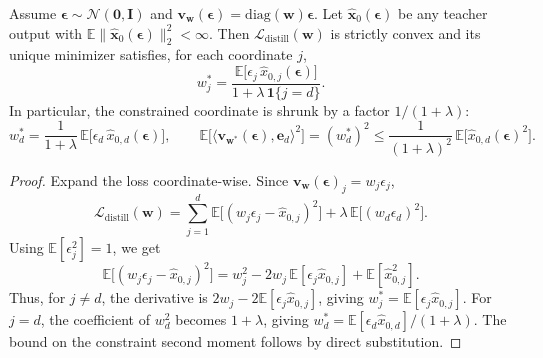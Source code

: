 \documentclass[10pt,a4paper]{amsart}
\begin{document}
\begin{theorem}
\label{thm:distill_closed_form}
Assume \(\bm{\epsilon}\sim\mathcal{N}(\bm{0},\bm{I})\) and \(\bm{v}_{\bm{w}}(\bm{\epsilon})=\mathrm{diag}(\bm{w})\bm{\epsilon}\).
Let \(\widehat{\bm{x}}_0(\bm{\epsilon})\) be any teacher output with \(\mathbb{E}\|\widehat{\bm{x}}_0(\bm{\epsilon})\|_2^2<\infty\).
Then \(\mathcal{L}_{\mathrm{distill}}(\bm{w})\) is strictly convex and its unique minimizer satisfies, for each coordinate \(j\),
\[
w_j^* =
\frac{\mathbb{E}\bigl[\epsilon_j\,\widehat{x}_{0,j}(\bm{\epsilon})\bigr]}{1+\lambda\,\mathbf{1}\{j=d\}}.
\]
In particular, the constrained coordinate is shrunk by a factor \(1/(1+\lambda)\):
\[
w_d^* = \frac{1}{1+\lambda}\,\mathbb{E}\bigl[\epsilon_d\,\widehat{x}_{0,d}(\bm{\epsilon})\bigr],
\qquad
\mathbb{E}\bigl[\langle \bm{v}_{\bm{w}^*}(\bm{\epsilon}),\bm{e}_d\rangle^2\bigr]
=
(w_d^*)^2
\le \frac{1}{(1+\lambda)^2}\,
\mathbb{E}\bigl[\widehat{x}_{0,d}(\bm{\epsilon})^2\bigr].
\]
\end{theorem}

\begin{proof}
Expand the loss coordinate-wise. Since \(\bm{v}_{\bm{w}}(\bm{\epsilon})_j = w_j\epsilon_j\),
\[
\mathcal{L}_{\mathrm{distill}}(\bm{w})
=
\sum_{j=1}^d
\mathbb{E}\bigl[(w_j\epsilon_j-\widehat{x}_{0,j})^2\bigr]
+
\lambda\,\mathbb{E}\bigl[(w_d\epsilon_d)^2\bigr].
\]
Using \(\mathbb{E}[\epsilon_j^2]=1\), we get
\[
\mathbb{E}\bigl[(w_j\epsilon_j-\widehat{x}_{0,j})^2\bigr]
=
w_j^2 - 2w_j\,\mathbb{E}[\epsilon_j\widehat{x}_{0,j}] + \mathbb{E}[\widehat{x}_{0,j}^2].
\]
Thus, for \(j\neq d\), the derivative is \(2w_j-2\mathbb{E}[\epsilon_j\widehat{x}_{0,j}]\), giving
\(w_j^*=\mathbb{E}[\epsilon_j\widehat{x}_{0,j}]\).
For \(j=d\), the coefficient of \(w_d^2\) becomes \(1+\lambda\), giving
\(w_d^*=\mathbb{E}[\epsilon_d\widehat{x}_{0,d}]/(1+\lambda)\).
The bound on the constraint second moment follows by direct substitution.
\end{proof}
\end{document}
